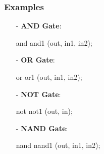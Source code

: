 \documentclass[12pt,openany]{book}
\begin{document}
			      	\subsubsection{Examples}
			      	
			      	\begin{itemize}
\item[-] \textbf{AND Gate}:
    \begin{vhdl}
    and and1 (out, in1, in2);
    \end{vhdl}
\item[-] \textbf{OR Gate}:
    \begin{vhdl}
    or or1 (out, in1, in2);
    \end{vhdl}
\item[-] \textbf{NOT Gate}:
    \begin{vhdl}
    not not1 (out, in);
    \end{vhdl}
\item[-] \textbf{NAND Gate}:
    \begin{vhdl}
    nand nand1 (out, in1, in2);
    \end{vhdl}
			      	\end{itemize}
			      	
\end{document}
